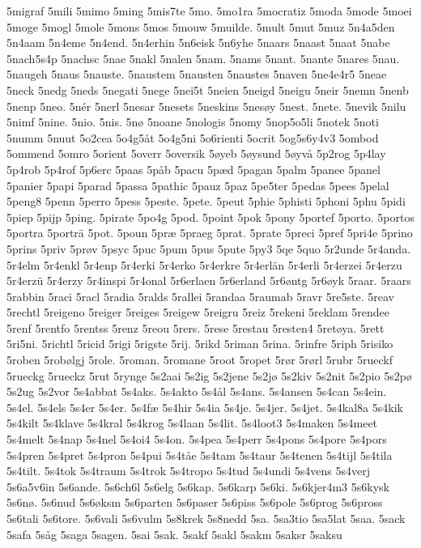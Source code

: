 5migraf
5mili
5mimo
5ming
5mis7te
5mo.
5mo1ra
5mocratiz
5moda
5mode
5moei
5moge
5mogl
5mole
5mons
5mos
5mouw
5muilde.
5mult
5mut
5muz
5n4a5den
5n4aam
5n4eme
5n4end.
5n4erhin
5n6eisk
5n6yhe
5naars
5naast
5naat
5nabe
5nach5s4p
5nachsc
5nae
5nakl
5nalen
5nam.
5nams
5nant.
5nante
5nares
5nau.
5naugeh
5naus
5nauste.
5naustem
5nausten
5naustes
5naven
5ne4e4r5
5neae
5neck
5nedg
5neds
5negati
5nege
5nei5t
5neien
5neigd
5neigu
5neir
5nemn
5nenb
5nenp
5neo.
5nér
5nerl
5nesar
5nesets
5neskins
5nesøy
5nest.
5nete.
5nevik
5nilu
5nimf
5nine.
5nio.
5nis.
5nø
5noane
5nologis
5nomy
5nop5o5li
5notek
5noti
5numm
5nuut
5o2cea
5o4g5åt
5o4g5ni
5o6rienti
5ocrit
5og5s6y4v3
5ombod
5ommend
5omro
5orient
5overr
5oversik
5øyeb
5øysund
5øyvå
5p2rog
5p4lay
5p4rob
5p4rof
5p6erc
5paas
5påb
5pacu
5pæd
5pagan
5palm
5panee
5panel
5panier
5papi
5parad
5passa
5pathic
5pauz
5paz
5pe5ter
5pedas
5pees
5pelal
5peng8
5penn
5perro
5pess
5peste.
5pete.
5peut
5phie
5phisti
5phoni
5phu
5pidi
5piep
5pijp
5ping.
5pirate
5po4g
5pod.
5point
5pok
5pony
5portef
5porto.
5portos
5portra
5porträ
5pot.
5poun
5præ
5praeg
5prat.
5prate
5preci
5pref
5pri4e
5prino
5prins
5priv
5prøv
5psyc
5puc
5pum
5pus
5pute
5py3
5qe
5quo
5r2unde
5r4anda.
5r4elm
5r4enkl
5r4enp
5r4erki
5r4erko
5r4erkre
5r4erlän
5r4erli
5r4erzei
5r4erzu
5r4erzü
5r4erzy
5r4inspi
5r4onal
5r6erlaen
5r6erland
5r6øntg
5r6øyk
5raar.
5raars
5rabbin
5raci
5racl
5radia
5ralds
5rallei
5randaa
5raumab
5ravr
5re5ste.
5reav
5rechtl
5reigeno
5reiger
5reiges
5reigew
5reigru
5reiz
5rekeni
5reklam
5rendee
5renf
5rentfo
5rentss
5renz
5reou
5rers.
5rese
5restau
5resten4
5retøya.
5rett
5ri5ni.
5richtl
5ricid
5rigi
5rigste
5rij.
5rikd
5riman
5rina.
5rinfre
5riph
5risiko
5roben
5robølgj
5role.
5roman.
5romane
5root
5ropet
5rør
5rørl
5rubr
5rueckf
5rueckg
5rueckz
5rut
5rynge
5s2aai
5s2ig
5s2jene
5s2jø
5s2kiv
5s2nit
5s2pio
5s2pø
5s2ug
5s2vor
5s4abbat
5s4aks.
5s4akto
5s4ål
5s4ans.
5s4ansen
5s4can
5s4ein.
5s4el.
5s4els
5s4er
5s4er.
5s4fæ
5s4hir
5s4ia
5s4je.
5s4jer.
5s4jet.
5s4kal8a
5s4kik
5s4kilt
5s4klave
5s4kral
5s4krog
5s4laan
5s4lit.
5s4loot3
5s4maken
5s4meet
5s4melt
5s4nap
5s4nel
5s4oi4
5s4on.
5s4pea
5s4perr
5s4pons
5s4pore
5s4pors
5s4pren
5s4pret
5s4pron
5s4pui
5s4tåe
5s4tam
5s4taur
5s4tenen
5s4tijl
5s4tila
5s4tilt.
5s4tok
5s4traum
5s4trok
5s4tropo
5s4tud
5s4undi
5s4vens
5s4verj
5s6a5v6in
5s6ande.
5s6ch6l
5s6elg
5s6kap.
5s6karp
5s6ki.
5s6kjer4m3
5s6kysk
5s6nø.
5s6nud
5s6øksm
5s6parten
5s6paser
5s6piss
5s6pole
5s6prog
5s6pross
5s6tali
5s6tore.
5s6vali
5s6vulm
5s8krek
5s8nedd
5sa.
5sa3tio
5sa5lat
5saa.
5sack
5safa
5såg
5saga
5sagen.
5sai
5sak.
5sakf
5sakl
5sakm
5saksr
5saksu
